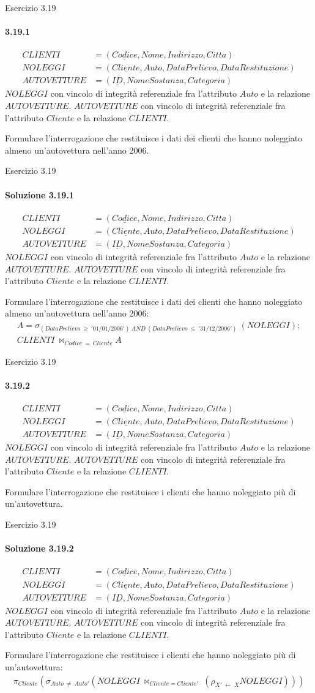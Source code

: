 \def\schemaEx3.19{\small \begin{align*}
    CLIENTI &= (\underline{Codice}, Nome, Indirizzo, Citta)\\
    NOLEGGI &= (\underline{Cliente}, Auto, DataPrelievo, DataRestituzione)\\
    AUTOVETTURE &= (\underline{ID}, NomeSostanza, Categoria)
    \end{align*}
    $NOLEGGI$ con vincolo di integrit\`a referenziale fra l'attributo $Auto$ e la relazione $AUTOVETTURE$.
    $AUTOVETTURE$ con vincolo di integrit\`a referenziale fra l'attributo $Cliente$ e la relazione $CLIENTI$.}
\begin{frame}{Esercizio 3.19}
    \framesubtitle{3.19.1}
    \vspace{-3.cm}
    \schemaEx3.19
    \vspace{.3cm}

    Formulare l'interrogazione che restituisce i dati dei clienti che hanno noleggiato almeno un'autovettura nell'anno 2006.
\end{frame}
%
\begin{frame}{Esercizio 3.19}
    \framesubtitle{Soluzione 3.19.1}
    \vspace*{-2cm}
    \schemaEx3.19
    \vspace{.3cm}

    {\small Formulare l'interrogazione che restituisce i dati dei clienti che hanno noleggiato almeno un'autovettura nell'anno 2006:}
    \small
    \begin{gather*}
        A = \sigma_{(DataPrelievo~\geq~'01/01/2006')~AND~(DataPrelievo~\leq~'31/12/2006')}~(NOLEGGI);\\
        CLIENTI~\bowtie_{Codice~=~Cliente} A
    \end{gather*}
\end{frame}
%
\begin{frame}{Esercizio 3.19}
    \framesubtitle{3.19.2}
    \vspace{-3.cm}
    \schemaEx3.19
    \vspace{.3cm}

    Formulare l'interrogazione che restituisce i clienti che hanno noleggiato pi\`u di un'autovettura.
\end{frame}
%
\begin{frame}{Esercizio 3.19}
    \framesubtitle{Soluzione 3.19.2}
    \vspace*{-2cm}
    \schemaEx3.19
    \vspace{.3cm}

    {\small Formulare l'interrogazione che restituisce i clienti che hanno noleggiato pi\`u di un'autovettura:}
    \small
    \begin{gather*}
        \pi_{Cliente} (\sigma_{Auto~\neq~Auto'} (NOLEGGI~\bowtie_{Cliente=Cliente'}~(\rho_{X'~\leftarrow~X} NOLEGGI)))
    \end{gather*}
\end{frame}

